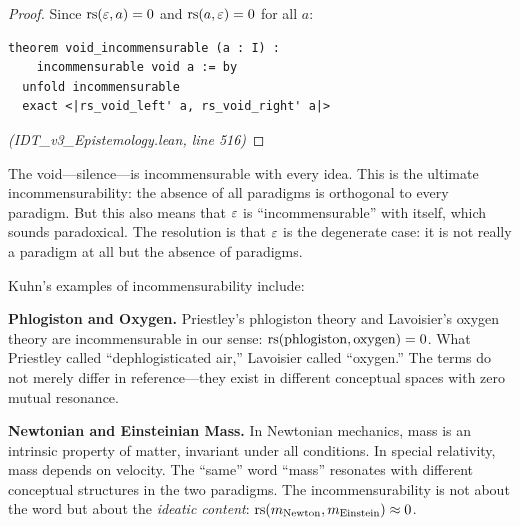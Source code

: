 \begin{proof}
Since $\mathrm{rs}(\varepsilon, a) = 0$ and $\mathrm{rs}(a, \varepsilon) = 0$ for all $a$:
\begin{lstlisting}
theorem void_incommensurable (a : I) :
    incommensurable void a := by
  unfold incommensurable
  exact <|rs_void_left' a, rs_void_right' a|>
\end{lstlisting}
\textit{(IDT\_v3\_Epistemology.lean, line 516)}
\end{proof}

\begin{interpretation}
The void---silence---is incommensurable with every idea. This is the ultimate
incommensurability: the absence of all paradigms is orthogonal to every
paradigm. But this also means that $\varepsilon$ is ``incommensurable'' with itself,
which sounds paradoxical. The resolution is that $\varepsilon$ is the degenerate case:
it is not really a paradigm at all but the absence of paradigms.
\end{interpretation}

\begin{remark}
Kuhn's examples of incommensurability include:

\textbf{Phlogiston and Oxygen.} Priestley's phlogiston theory and Lavoisier's oxygen
theory are incommensurable in our sense: $\mathrm{rs}(\text{phlogiston}, \text{oxygen}) = 0$.
What Priestley called ``dephlogisticated air,'' Lavoisier called ``oxygen.'' The
terms do not merely differ in reference---they exist in different conceptual spaces
with zero mutual resonance.

\textbf{Newtonian and Einsteinian Mass.} In Newtonian mechanics, mass is an intrinsic
property of matter, invariant under all conditions. In special relativity, mass
depends on velocity. The ``same'' word ``mass'' resonates with different
conceptual structures in the two paradigms. The incommensurability is not about
the word but about the \emph{ideatic content}: $\mathrm{rs}(m_{\text{Newton}},
m_{\text{Einstein}}) \approx 0$.
\end{remark}

